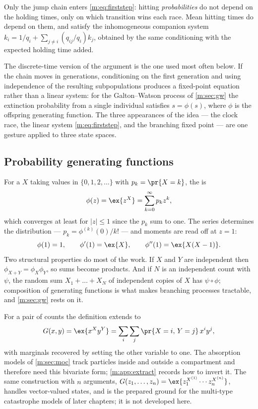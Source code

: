 Only the jump chain enters \cref{m:eq:firststep}: hitting \emph{probabilities} do
not depend on the holding times, only on which transition wins each race. Mean
hitting times do depend on them, and satisfy the inhomogeneous companion system
$k_i = 1/q_i + \sum_{j\neq i}(q_{ij}/q_i)k_j$, obtained by the same conditioning
with the expected holding time added.

The discrete-time version of the argument is the one used most often below. If the
chain moves in generations, conditioning on the first generation and using
independence of the resulting subpopulations produces a fixed-point equation rather
than a linear system: for the Galton--Watson process of \cref{m:sec:gw} the
extinction probability from a single individual satisfies $s=\phi(s)$, where $\phi$
is the offspring generating function. The three appearances of the idea --- the
clock race, the linear system \cref{m:eq:firststep}, and the branching fixed point
--- are one gesture applied to three state spaces.

\subsection{Probability generating functions}
\label{m:sec:pgf}

For a \rv{} $X$ taking values in $\{0,1,2,\dots\}$ with $p_k = \pr{X=k}$, the
\pgf{} is
\begin{equation}
\label{m:eq:pgfdef}
\phi(z) = \ex{z^X} = \sum_{k=0}^{\infty}p_k z^k ,
\end{equation}
which converges at least for $|z|\le1$ since the $p_k$ sum to one. The series
determines the distribution --- $p_k = \phi^{(k)}(0)/k!$ --- and moments are read
off at $z=1$:
\begin{equation}
\label{m:eq:pgfmoments}
\phi(1) = 1,
\qquad
\phi'(1) = \ex{X},
\qquad
\phi''(1) = \ex{X(X-1)} .
\end{equation}
Two structural properties do most of the work. If $X$ and $Y$ are independent then
$\phi_{X+Y} = \phi_X\phi_Y$, so sums become products. And if $N$ is an independent
count with \pgf{} $\psi$, the random sum $X_1+\dots+X_N$ of independent copies of
$X$ has \pgf{} $\psi\circ\phi$; composition of generating functions is what makes
branching processes tractable, and \cref{m:sec:gw} rests on it.

For a pair of counts the definition extends to
\begin{equation}
\label{m:eq:pgfbivariate}
G(x,y) = \ex{x^{X}y^{Y}} = \sum_{i}\sum_{j}\pr{X=i,\,Y=j}\,x^iy^j ,
\end{equation}
with marginals recovered by setting the other variable to one. The absorption
models of \cref{m:sec:moc} track particles inside and outside a compartment and
therefore need this bivariate form; \cref{m:app:extract} records how to invert it.
The same construction with $n$ arguments,
$G(z_1,\dots,z_n) = \ex{z_1^{X^{(1)}}\cdots z_n^{X^{(n)}}}$, handles vector-valued
states, and is the prepared ground for the multi-type catastrophe models of later
chapters; it is not developed here.

